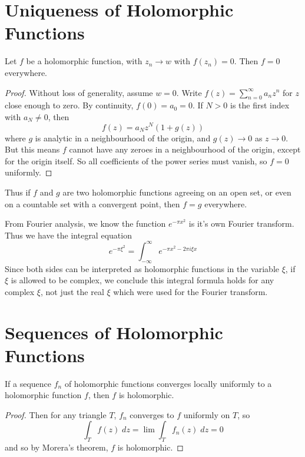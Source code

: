 \section{Uniqueness of Holomorphic Functions}

\begin{theorem}
    Let $f$ be a holomorphic function, with $z_n \to w$ with $f(z_n) = 0$. Then $f = 0$ everywhere.
\end{theorem}
\begin{proof}
    Without loss of generality, assume $w = 0$. Write $f(z) = \sum_{n = 0}^\infty a_n z^n$ for $z$ close enough to zero. By continuity, $f(0) = a_0 = 0$. If $N > 0$ is the first index with $a_N \neq 0$, then
    \[ f(z) = a_N z^N(1 + g(z)) \]
    where $g$ is analytic in a neighbourhood of the origin, and $g(z) \to 0$ as $z \to 0$. But this means $f$ cannot have any zeroes in a neighbourhood of the origin, except for the origin itself. So all coefficients of the power series must vanish, so $f = 0$ uniformly.
\end{proof}

Thus if $f$ and $g$ are two holomorphic functions agreeing on an open set, or even on a countable set with a convergent point, then $f = g$ everywhere.

\begin{example}
    From Fourier analysis, we know the function $e^{-\pi x^2}$ is it's own Fourier transform. Thus we have the integral equation
    \[ e^{- \pi \xi^2} = \int_{-\infty}^\infty e^{- \pi x^2 - 2 \pi i \xi x} \]
    Since both sides can be interpreted as holomorphic functions in the variable $\xi$, if $\xi$ is allowed to be complex, we conclude this integral formula holds for any complex $\xi$, not just the real $\xi$ which were used for the Fourier transform.
\end{example}

\section{Sequences of Holomorphic Functions}

\begin{theorem}
    If a sequence $f_n$ of holomorphic functions converges locally uniformly to a holomorphic function $f$, then $f$ is holomorphic.
\end{theorem}
\begin{proof}
    Then for any triangle $T$, $f_n$ converges to $f$ uniformly on $T$, so
    \[ \int_T f(z)\; dz = \lim \int_T f_n(z)\; dz = 0 \]
    and so by Morera's theorem, $f$ is holomorphic.
\end{proof}

